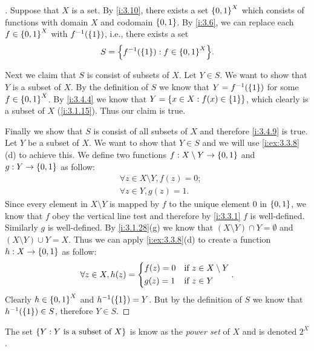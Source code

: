 \begin{proof}[]
  Suppose that \(X\) is a set.
  By \cref{i:3.10}, there exists a set \(\left\lbrace0, 1\right\rbrace^X\) which consists of functions with domain \(X\) and codomain \(\left\lbrace0, 1\right\rbrace\).
  By \cref{i:3.6}, we can replace each \(f \in \left\lbrace0, 1\right\rbrace^X\) with \(f^{-1}\pa{\set{1}}\), i.e., there exists a set
  \[
    S = \set{f^{-1}\pa{\set{1}} : f \in \set{0, 1}^X}.
  \]

  Next we claim that \(S\) is consist of subsets of \(X\).
  Let \(Y \in S\).
  We want to show that \(Y\) is a subset of \(X\).
  By the definition of \(S\) we know that \(Y = f^{-1}\pa{\set{1}}\) for some \(f \in \left\lbrace0, 1\right\rbrace^X\).
  By \cref{i:3.4.4} we know that \(Y = \left\lbrace x \in X : f(x) \in \left\lbrace1\right\rbrace\right\rbrace\), which clearly is a subset of \(X\) (\cref{i:3.1.15}).
  Thus our claim is true.

  Finally we show that \(S\) is consist of all subsets of \(X\) and therefore \cref{i:3.4.9} is true.
  Let \(Y\) be a subset of \(X\).
  We want to show that \(Y \in S\) and we will use \cref{i:ex:3.3.8}(d) to achieve this.
  We define two functions \(f : X \setminus Y \to \left\lbrace0, 1\right\rbrace\) and \(g : Y \to \left\lbrace0, 1\right\rbrace\) as follow:
  \begin{align*}
     & \forall z \in X \setminus Y, f(z) = 0; \\
     & \forall z \in Y, g(z) = 1.
  \end{align*}
  Since every element in \(X \setminus Y\) is mapped by \(f\) to the unique element \(0\) in \(\left\lbrace0, 1\right\rbrace\), we know that \(f\) obey the vertical line test and therefore by \cref{i:3.3.1} \(f\) is well-defined.
  Similarly \(g\) is well-defined.
  By \cref{i:3.1.28}(g) we know that \((X \setminus Y) \cap Y = \emptyset\) and \((X \setminus Y) \cup Y = X\).
  Thus we can apply \cref{i:ex:3.3.8}(d) to create a function \(h : X \to \left\lbrace0, 1\right\rbrace\) as follow:
  \[
    \forall z \in X, h(z) = \begin{dcases}
      f(z) = 0 & \text{if } z \in X \setminus Y \\
      g(z) = 1 & \text{if } z \in Y
    \end{dcases}.
  \]
  Clearly \(h \in \left\lbrace0, 1\right\rbrace^X\) and \(h^{-1}\pa{\set{1}} = Y\).
  But by the definition of \(S\) we know that \(h^{-1}\pa{\set{1}} \in S\), therefore \(Y \in S\).
\end{proof}

\begin{rmk}\label{i:3.4.10}
  The set \(\left\lbrace Y : Y \text{ is a subset of } X\right\rbrace\) is know as the \emph{power set} of \(X\) and is denoted \(2^X\).
\end{rmk}

